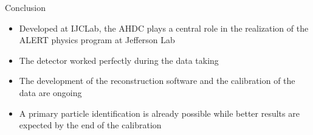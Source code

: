 \documentclass[10pt,aspectratio=43]{beamer}
\begin{document}
\begin{frame}{Conclusion}
    \begin{itemize}
        \item Developed at IJCLab, the AHDC plays a central role in the realization of the ALERT physics program at Jefferson Lab 
        \item The detector worked perfectly during the data taking
        \item The development of the reconstruction software and the calibration of the data are ongoing
        \item A primary particle identification is already possible while better results are expected by the end of the calibration
    \end{itemize}

    \centering
    \vspace{1cm}
\end{frame}
\end{document}

